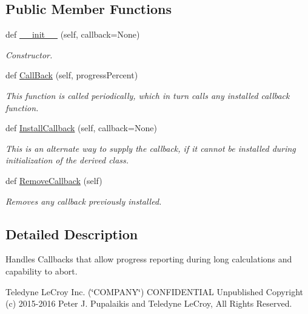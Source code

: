 \subsection*{Public Member Functions}
\begin{DoxyCompactItemize}
\item 
def \hyperlink{classSignalIntegrity_1_1CallBacker_1_1CallBacker_a5580a7fcf0bfd317a8f8c7c80eefdd69}{\+\_\+\+\_\+init\+\_\+\+\_\+} (self, callback=None)
\begin{DoxyCompactList}\small\item\em Constructor. \end{DoxyCompactList}\item 
def \hyperlink{classSignalIntegrity_1_1CallBacker_1_1CallBacker_ad1aebee41f7b067b9fc11c28f87b27ba}{Call\+Back} (self, progress\+Percent)
\begin{DoxyCompactList}\small\item\em This function is called periodically, which in turn calls any installed callback function. \end{DoxyCompactList}\item 
def \hyperlink{classSignalIntegrity_1_1CallBacker_1_1CallBacker_a9307eb7d2258b5f1df8bfc5f43effcab}{Install\+Callback} (self, callback=None)
\begin{DoxyCompactList}\small\item\em This is an alternate way to supply the callback, if it cannot be installed during initialization of the derived class. \end{DoxyCompactList}\item 
def \hyperlink{classSignalIntegrity_1_1CallBacker_1_1CallBacker_ac93a2d2ea7a87653318147244b98b31c}{Remove\+Callback} (self)
\begin{DoxyCompactList}\small\item\em Removes any callback previously installed. \end{DoxyCompactList}\end{DoxyCompactItemize}


\subsection{Detailed Description}
Handles Callbacks that allow progress reporting during long calculations and capability to abort. 

Teledyne Le\+Croy Inc. (\char`\"{}\+C\+O\+M\+P\+A\+N\+Y\char`\"{}) C\+O\+N\+F\+I\+D\+E\+N\+T\+I\+AL Unpublished Copyright (c) 2015-\/2016 Peter J. Pupalaikis and Teledyne Le\+Croy, All Rights Reserved.

